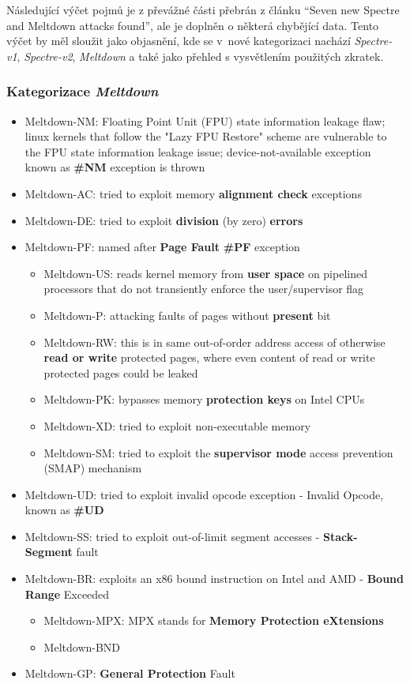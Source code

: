 Následující výčet pojmů je z převážné části přebrán z článku \enquote{Seven new Spectre and Meltdown attacks found}, ale je doplněn o některá chybějící data.
Tento výčet by měl sloužit jako objasnění, kde se v~nové kategorizaci nachází \textit{Spectre-v1}, \textit{Spectre-v2}, \textit{Meltdown} a také jako přehled s vysvětlením použitých zkratek.

\subsubsection{Kategorizace \textit{Meltdown}}

\begin{itemize}
    \item Meltdown-NM: Floating Point Unit (FPU) state information leakage flaw; linux kernels that follow the "Lazy FPU Restore" scheme are vulnerable to the FPU state information leakage issue; device-not-available exception known as \textbf{\#NM} exception is thrown
    \item Meltdown-AC: tried to exploit memory \textbf{alignment check} exceptions
    \item Meltdown-DE: tried to exploit \textbf{division} (by zero) \textbf{errors}
    \item Meltdown-PF: named after \textbf{Page Fault} \textbf{\#PF} exception
    \begin{itemize}
        \item Meltdown-US: reads kernel memory from \textbf{user space} on pipelined processors that do not transiently enforce the user/supervisor flag
        \item Meltdown-P: attacking faults of pages without \textbf{present} bit
        \item Meltdown-RW: this is in same out-of-order address access of otherwise \textbf{read or write} protected pages, where even content of read or write protected pages could be leaked
        \item Meltdown-PK: bypasses memory \textbf{protection keys} on Intel CPUs
        \item Meltdown-XD: tried to exploit non-executable memory
        \item Meltdown-SM: tried to exploit the \textbf{supervisor mode} access prevention (SMAP) mechanism
    \end{itemize}
    \item Meltdown-UD: tried to exploit invalid opcode exception - Invalid Opcode, known as \textbf{\#UD}
    \item Meltdown-SS: tried to exploit out-of-limit segment accesses - \textbf{Stack-Segment} fault
    \item Meltdown-BR: exploits an x86 bound instruction on Intel and AMD - \textbf{Bound Range} Exceeded
    \begin{itemize}
        \item Meltdown-MPX: MPX stands for \textbf{Memory Protection eXtensions}
        \item Meltdown-BND
    \end{itemize}
    \item Meltdown-GP: \textbf{General Protection} Fault
\end{itemize}

